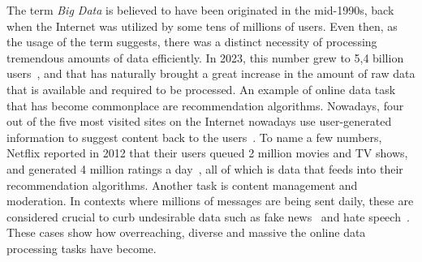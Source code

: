 %
%
%
%
%
%
%
%

The term {\it Big Data} is believed to have been originated in the mid-1990s, back when the Internet was utilized by some tens of millions of users. Even then, as the usage of the term suggests, there was a distinct necessity of processing tremendous amounts of data efficiently. In 2023, this number grew to 5,4 billion users~\cite{netuse}, and that has naturally brought a great increase in the amount of raw data that is available and required to be processed.
An example of online data task that has become commonplace are recommendation algorithms. Nowadays, four out of the five most visited sites on the Internet nowadays use user-generated information to suggest content back to the users~\cite{topwebsites}. 
To name a few numbers, Netflix reported in 2012 that their users queued 2 million movies and TV shows, and generated 4 million ratings a day~\cite{netflixsize}, all of which is data that feeds into their recommendation algorithms.   
Another task is content management and moderation. In contexts where millions of messages are being sent daily, these are considered crucial to curb undesirable data such as fake news~\cite{fakenews} and hate speech~\cite{hatespeech}.
These cases show how overreaching, diverse and massive the online data processing tasks have become.

